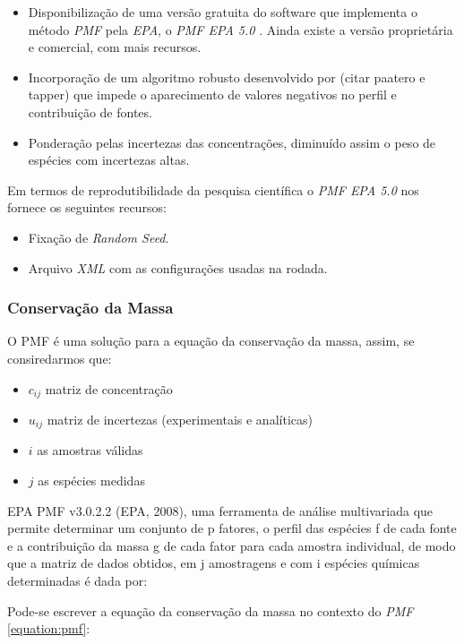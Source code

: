 \begin{itemize}
  \item Disponibilização de uma versão gratuita do software que implementa 
        o método \textit{PMF} pela \textit{EPA}, o \textit{PMF EPA 5.0} 
        \citep{Norris:2014}. 
        Ainda existe a versão proprietária e comercial, com mais recursos.   
  \item Incorporação de um algoritmo robusto desenvolvido por (citar paatero e tapper) 
        que impede o aparecimento de valores negativos no perfil e 
        contribuição de fontes.
  \item Ponderação pelas incertezas das concentrações, diminuído assim o peso 
        de espécies com incertezas altas.
\end{itemize}  

Em termos de reprodutibilidade da pesquisa científica o \textit{PMF EPA 5.0} 
nos fornece os seguintes recursos:

\begin{itemize}
  \item Fixação de \textit{Random Seed}.%
  \item Arquivo \textit{XML} com as configurações usadas na rodada. 
\end{itemize} 

\subsubsection{Conservação da Massa}
O PMF é uma solução para a equação da conservação da massa, assim, se 
consiredarmos que:
\begin{itemize}
  \item $c_{ij}$ matriz de concentração
  \item $u_{ij}$ matriz de incertezas (experimentais e analíticas)
  \item $i$ as amostras válidas
  \item $j$ as espécies medidas
\end{itemize}

EPA PMF v3.0.2.2 (EPA, 2008), uma ferramenta de análise multivariada que permite determinar um conjunto de p fatores, o perfil das espécies f de cada fonte e a contribuição da massa g de cada fator para cada amostra individual, de modo que a matriz de dados obtidos, em j amostragens e com i espécies químicas determinadas é dada por:

Pode-se escrever a equação da conservação da massa no 
contexto do \textit{PMF} \ref{equation:pmf}: 

